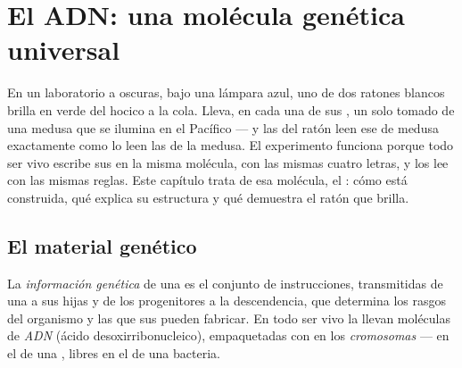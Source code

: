 \chapter{El ADN: una molécula genética universal}\label{ch:g10:universal-dna}

En un laboratorio a oscuras, bajo una lámpara azul, uno de dos ratones
blancos brilla en verde del hocico a la cola. Lleva, en cada una de sus
, un solo  tomado de una medusa que se ilumina en el Pacífico
--- y las  del ratón leen ese  de medusa exactamente como lo
leen las  de la medusa. El experimento funciona porque todo ser
vivo escribe sus  en la misma molécula, con las mismas cuatro
letras, y los lee con las mismas reglas. Este capítulo trata de esa
molécula, el : cómo está construida, qué explica su estructura y qué
demuestra el ratón que brilla.

\section{El material genético}

\begin{definition}\label{def:g10:universal-dna:information}
La \emph{información genética} de una
 es el conjunto de instrucciones, transmitidas de una  a
sus  hijas y de los progenitores a la descendencia, que
determina los rasgos del organismo y las  que sus 
pueden fabricar. En todo ser vivo la llevan moléculas de
\emph{ADN} (ácido desoxirribonucleico), empaquetadas con
 en los \emph{cromosomas} --- en el  de
una , libres en el  de una bacteria.
\end{definition}

